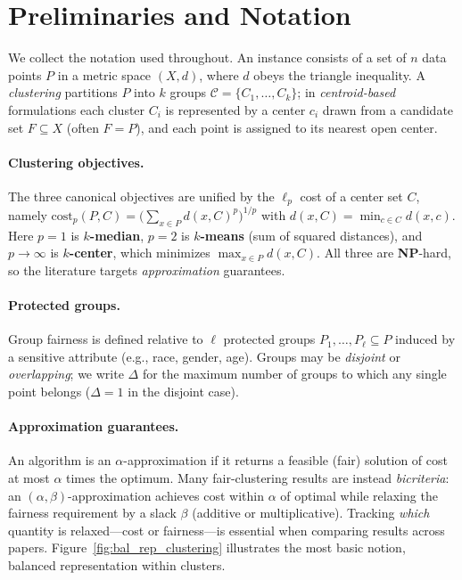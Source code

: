 \section{Preliminaries and Notation}\label{sec:prelim}
\aibanner

We collect the notation used throughout. An instance consists of a set of $n$ data points $P$ in a metric space $(X,d)$, where $d$ obeys the triangle inequality. A \emph{clustering} partitions $P$ into $k$ groups $\mathcal{C}=\{C_1,\dots,C_k\}$; in \emph{centroid-based} formulations each cluster $C_i$ is represented by a center $c_i$ drawn from a candidate set $F\subseteq X$ (often $F=P$), and each point is assigned to its nearest open center.

\paragraph{Clustering objectives.} The three canonical objectives are unified by the $\ell_p$ cost of a center set $C$, namely $\mathrm{cost}_p(P,C)=\big(\sum_{x\in P} d(x,C)^p\big)^{1/p}$ with $d(x,C)=\min_{c\in C} d(x,c)$. Here $p=1$ is \textbf{$k$-median}, $p=2$ is \textbf{$k$-means} (sum of squared distances), and $p\to\infty$ is \textbf{$k$-center}, which minimizes $\max_{x\in P} d(x,C)$. All three are {\bf NP}-hard, so the literature targets \emph{approximation} guarantees.

\paragraph{Protected groups.} Group fairness is defined relative to $\ell$ protected groups $P_1,\dots,P_\ell\subseteq P$ induced by a sensitive attribute (e.g., race, gender, age). Groups may be \emph{disjoint} or \emph{overlapping}; we write $\Delta$ for the maximum number of groups to which any single point belongs ($\Delta=1$ in the disjoint case).

\paragraph{Approximation guarantees.} An algorithm is an $\alpha$-approximation if it returns a feasible (fair) solution of cost at most $\alpha$ times the optimum. Many fair-clustering results are instead \emph{bicriteria}: an $(\alpha,\beta)$-approximation achieves cost within $\alpha$ of optimal while relaxing the fairness requirement by a slack $\beta$ (additive or multiplicative). Tracking \emph{which} quantity is relaxed---cost or fairness---is essential when comparing results across papers. Figure~\ref{fig:bal_rep_clustering} illustrates the most basic notion, balanced representation within clusters.

